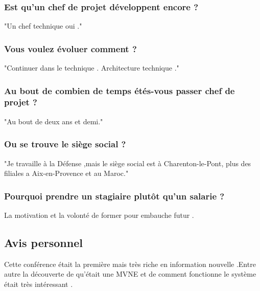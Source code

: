	\subsubsection{Est qu'un chef de projet développent encore ?}
	"Un chef technique oui ."
	\subsubsection{Vous voulez évoluer comment ?}
	"Continuer dans le technique . Architecture technique ."
	\subsubsection{Au bout de combien de temps étés-vous passer chef de projet ?}
	"Au bout de deux ans et demi." 
	\subsubsection{Ou se trouve le siège social ?}
	"Je travaille à la Défense ,mais le siège social est à Charenton-le-Pont, plus des filiales a Aix-en-Provence et au Maroc."
	\subsubsection{Pourquoi prendre un stagiaire plutôt qu'un salarie ?}
La motivation et la volonté de former pour embauche futur .	
	
 \subsection{Avis personnel}
 Cette conférence était la première mais très riche en information nouvelle .Entre autre la découverte de qu'était une MVNE et de comment fonctionne le système était très intéressant . 
 